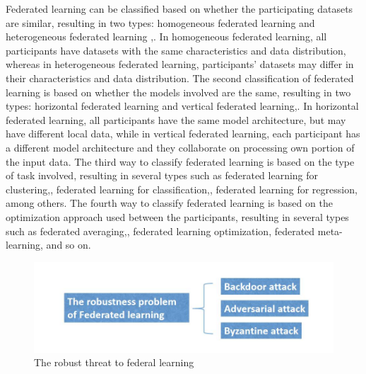 \documentclass[conference]{IEEEtran}
\begin{document}
Federated learning can be classified based on whether the participating datasets are similar, resulting in two types: homogeneous federated
learning  and heterogeneous federated learning \cite{b10},\cite{b11}. In homogeneous federated
learning, all participants have datasets with the same characteristics and data distribution, whereas in heterogeneous federated learning,
participants' datasets may differ in their characteristics and data distribution. The second classification of federated learning is based
on whether the models involved are the same, resulting in two types: horizontal federated learning and vertical
federated learning\cite{b12},\cite{b13}. In horizontal federated learning, all participants have the same model architecture, but may
have different local data\cite{b14}, while in vertical federated learning, each participant has a different model architecture and they collaborate on
processing own portion of the input data\cite{b15}. The third way to classify federated learning is based on the type of task involved, resulting in several
types such as federated learning for clustering\cite{b16},\cite{b17}, federated learning for classification\cite{b18},\cite{b19}, federated learning for regression\cite{b20}, among others.
The fourth way to classify federated learning is based on the optimization approach used between the participants, resulting in several types such as
federated averaging\cite{b21},\cite{b22}, federated learning optimization, federated meta-learning\cite{b23}, and so on.


\begin{figure}[htbp]
    \centerline{\includegraphics[width=0.8\linewidth,height=0.6\linewidth]{picture/f4.jpg}}
    \caption{The robust threat to federal learning}
    \label{fig2}
\end{figure}
\end{document}
